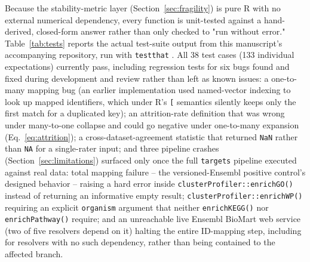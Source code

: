 \documentclass[webpdf,contemporary,large]{oup-authoring-template}
\theoremstyle{thmstyleone}%
\theoremstyle{thmstyletwo}%
\theoremstyle{thmstylethree}%
\begin{document}
Because the stability-metric layer (Section~\ref{sec:fragility}) is pure R with no external numerical dependency, every function is unit-tested against a hand-derived, closed-form answer rather than only checked to "run without error." Table~\ref{tab:tests} reports the actual test-suite output from this manuscript's accompanying repository, run with \texttt{testthat} \citep{wickham2011testthat}. All 38 test cases (133 individual expectations) currently pass, including regression tests for six bugs found and fixed during development and review rather than left as known issues: a one-to-many mapping bug (an earlier implementation used named-vector indexing to look up mapped identifiers, which under R's \texttt{[} semantics silently keeps only the first match for a duplicated key); an attrition-rate definition that was wrong under many-to-one collapse and could go negative under one-to-many expansion (Eq.~\ref{eq:attrition}); a cross-dataset-agreement statistic that returned \texttt{NaN} rather than \texttt{NA} for a single-rater input; and three pipeline crashes (Section~\ref{sec:limitations}) surfaced only once the full \texttt{targets} pipeline executed against real data: total mapping failure -- the versioned-Ensembl positive control's designed behavior -- raising a hard error inside \texttt{clusterProfiler::enrichGO()} instead of returning an informative empty result; \texttt{clusterProfiler::enrichWP()} requiring an explicit \texttt{organism} argument that neither \texttt{enrichKEGG()} nor \texttt{enrichPathway()} require; and an unreachable live Ensembl BioMart web service (two of five resolvers depend on it) halting the entire ID-mapping step, including for resolvers with no such dependency, rather than being contained to the affected branch.
\end{document}
